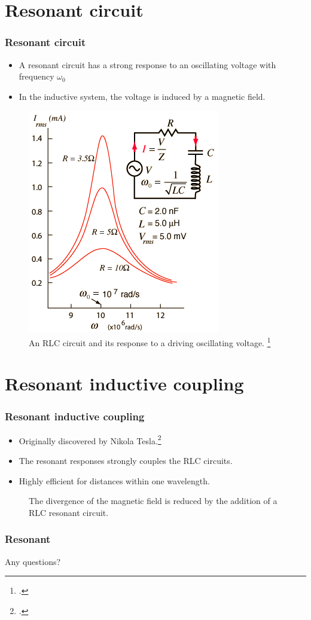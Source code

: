 \documentclass{beamer}
\begin{document}
\section{Resonant circuit}
\begin{frame}
  \frametitle{Resonant circuit}
  \begin{itemize}
    \item A resonant circuit has a strong response to an oscillating voltage
      with frequency $\omega_0$
    \item In the inductive system, the voltage is induced by a magnetic field.
  \end{itemize}
  \begin{figure}
  \includegraphics[scale=0.3]{images/RLC.png}
  \caption{An RLC circuit
    and its response to a driving oscillating voltage. \footcite{hyperphysicsresonate}}
  \end{figure}
\end{frame}

\section{Resonant inductive coupling}
\begin{frame}
  \frametitle{Resonant inductive coupling}
  \begin{itemize}
    \item Originally discovered by Nikola Tesla.\footcite{tesla}
    \item The resonant responses strongly couples the RLC circuits.
    \item Highly efficient for distances within one wavelength.
  \end{itemize}
  \begin{figure}
    
    \caption{The divergence of the magnetic field is reduced by the addition of
    a RLC resonant circuit.}
  \end{figure}
\end{frame}

\begin{frame}
  \frametitle{Resonant}
\end{frame}

\begin{frame}
  \center
  \begin{block}{Any questions?}
  \end{block}
\end{frame}
\end{document}
